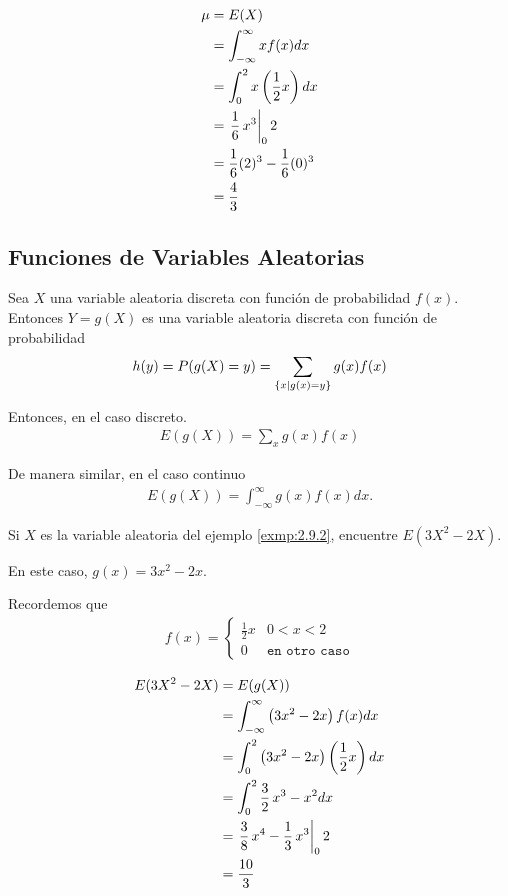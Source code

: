 {}
\begin{align}
 \mu &= E(X)\\ & = \int_{-\infty}^{\infty} xf(x) dx \\
  &= \int_{0}^{2} x\left( \dfrac{1}{2}x \right) dx\\
  &= \left. \frac{1}{6} \, x^{3} \right|_{0}{2}\\
  &= \frac{1}{6}(2)^{3}-\frac{1}{6}(0)^{3} \\
  &= \frac{4}{3}
\end{align}


\subsection{Funciones de Variables Aleatorias}

 Sea $X$ una variable aleatoria discreta con función de probabilidad $f(x).$ Entonces $Y=g(X)$ es una variable aleatoria discreta con función de probabilidad
 \begin{align}
  h(y)=P(g(X)=y)=\sum_{\left\{ x|g(x)=y \right\}}g(x)f(x)
 \end{align}



 Entonces, en el caso discreto.
 \begin{align}
 \label{eq:2.9.5}
  E\left( g(X) \right)=
  \sum_{x}g(x)f(x)
 \end{align}

 De manera similar, en el caso continuo
 \begin{align}
  \label{eq:2.9.6}
  E\left( g(X) \right)=\int_{-\infty}^{\infty}
  g(x)f(x)dx.
 \end{align}




 \begin{ejemplo}
  \label{exmp:2.9.3}
  Si $X$ es la variable aleatoria del ejemplo \ref{exmp:2.9.2}, encuentre $E\left( 3X^{2}-2X \right).$
 \end{ejemplo}


{}
En este caso, $g(x)=3x^2-2x.$



Recordemos que
  \begin{align}
   f(x)=
   \begin{cases}
    \frac{1}{2}x & 0<x<2 \\
    0 & \texttt{en otro caso}
   \end{cases}
  \end{align}



\begin{align}
 E(3X^2-2X) &= E(g(X)) \\
  &= \displaystyle \int_{-\infty}^{\infty} \left( 3x^2-2x \right)f(x)dx\\
  &= \displaystyle \int_{0}^{2}\left( 3x^2-2x \right)\left( \dfrac{1}{2}x \right)dx \\
  &= \displaystyle \int_{0}^{2} \frac{3}{2} \, x^{3} - x^{2} dx
 \\  &= \displaystyle \left. \frac{3}{8} \, x^{4} - \frac{1}{3} \, x^{3}
 \right|_{0}{2}
\\  &= \displaystyle
\frac{10}{3}
\end{align}


